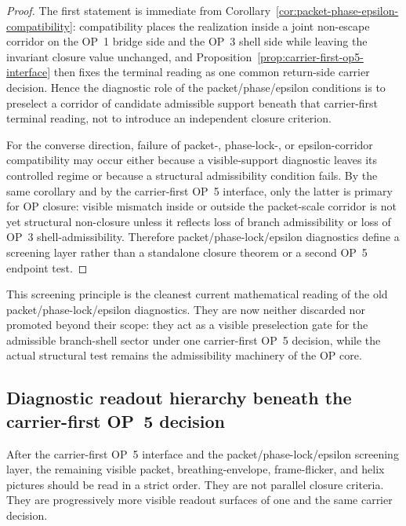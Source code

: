 \begin{proof}
The first statement is immediate from Corollary~\ref{cor:packet-phase-epsilon-compatibility}: compatibility places the realization inside a joint non-escape corridor on the OP~1 bridge side and the OP~3 shell side while leaving the invariant closure value unchanged, and Proposition~\ref{prop:carrier-first-op5-interface} then fixes the terminal reading as one common return-side carrier decision. Hence the diagnostic role of the packet/phase/epsilon conditions is to preselect a corridor of candidate admissible support beneath that carrier-first terminal reading, not to introduce an independent closure criterion.

For the converse direction, failure of packet-, phase-lock-, or epsilon-corridor compatibility may occur either because a visible-support diagnostic leaves its controlled regime or because a structural admissibility condition fails. By the same corollary and by the carrier-first OP~5 interface, only the latter is primary for OP closure: visible mismatch inside or outside the packet-scale corridor is not yet structural non-closure unless it reflects loss of branch admissibility or loss of OP~3 shell-admissibility. Therefore packet/phase-lock/epsilon diagnostics define a screening layer rather than a standalone closure theorem or a second OP~5 endpoint test.
\end{proof}

\begin{remark}
This screening principle is the cleanest current mathematical reading of the old packet/phase-lock/epsilon diagnostics. They are now neither discarded nor promoted beyond their scope: they act as a visible preselection gate for the admissible branch-shell sector under one carrier-first OP~5 decision, while the actual structural test remains the admissibility machinery of the OP core.
\end{remark}


\subsection{Diagnostic readout hierarchy beneath the carrier-first OP~5 decision}
\label{sec:diagnostic-readout-hierarchy}

After the carrier-first OP~5 interface and the packet/phase-lock/epsilon screening layer, the remaining visible packet, breathing-envelope, frame-flicker, and helix pictures should be read in a strict order. They are not parallel closure criteria. They are progressively more visible readout surfaces of one and the same carrier decision.

